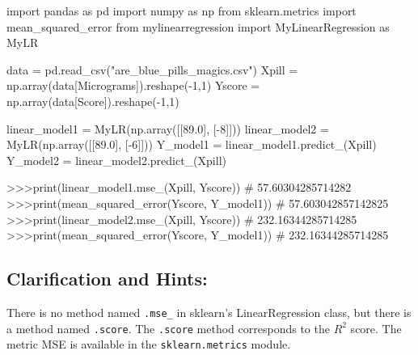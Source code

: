 \documentclass[]{article}
\newenvironment{Shaded}{\begin{snugshade}}{\end{snugshade}}
\newcommand{\BuiltInTok}[1]{\textcolor[rgb]{0.50,0.55,0.55}{#1}}
\newcommand{\CommentTok}[1]{\textcolor[rgb]{0.48,0.49,0.49}{#1}}
\newcommand{\DecValTok}[1]{\textcolor[rgb]{0.96,0.45,0.00}{#1}}
\newcommand{\FloatTok}[1]{\textcolor[rgb]{0.96,0.45,0.00}{#1}}
\newcommand{\ImportTok}[1]{\textcolor[rgb]{0.15,0.68,0.38}{#1}}
\newcommand{\NormalTok}[1]{\textcolor[rgb]{0.81,0.81,0.76}{#1}}
\newcommand{\OperatorTok}[1]{\textcolor[rgb]{0.81,0.81,0.76}{#1}}
\newcommand{\StringTok}[1]{\textcolor[rgb]{0.96,0.31,0.31}{#1}}
\begin{document}
\begin{Shaded}
\begin{Highlighting}[]
\ImportTok{import}\NormalTok{ pandas }\ImportTok{as}\NormalTok{ pd}
\ImportTok{import}\NormalTok{ numpy }\ImportTok{as}\NormalTok{ np}
\ImportTok{from}\NormalTok{ sklearn.metrics }\ImportTok{import}\NormalTok{ mean_squared_error}
\ImportTok{from}\NormalTok{ mylinearregression }\ImportTok{import}\NormalTok{ MyLinearRegression }\ImportTok{as}\NormalTok{ MyLR}

\NormalTok{data }\OperatorTok{=}\NormalTok{ pd.read_csv(}\StringTok{"are_blue_pills_magics.csv"}\NormalTok{)}
\NormalTok{Xpill }\OperatorTok{=}\NormalTok{ np.array(data[Micrograms]).reshape(}\OperatorTok{-}\DecValTok{1}\NormalTok{,}\DecValTok{1}\NormalTok{)}
\NormalTok{Yscore }\OperatorTok{=}\NormalTok{ np.array(data[Score]).reshape(}\OperatorTok{-}\DecValTok{1}\NormalTok{,}\DecValTok{1}\NormalTok{)}

\NormalTok{linear_model1 }\OperatorTok{=}\NormalTok{ MyLR(np.array([[}\FloatTok{89.0}\NormalTok{], [}\OperatorTok{-}\DecValTok{8}\NormalTok{]]))}
\NormalTok{linear_model2 }\OperatorTok{=}\NormalTok{ MyLR(np.array([[}\FloatTok{89.0}\NormalTok{], [}\OperatorTok{-}\DecValTok{6}\NormalTok{]]))}
\NormalTok{Y_model1 }\OperatorTok{=}\NormalTok{ linear_model1.predict_(Xpill)}
\NormalTok{Y_model2 }\OperatorTok{=}\NormalTok{ linear_model2.predict_(Xpill)}

\OperatorTok{>>>}\BuiltInTok{print}\NormalTok{(linear_model1.mse_(Xpill, Yscore))}
\CommentTok{# 57.60304285714282}
\OperatorTok{>>>}\BuiltInTok{print}\NormalTok{(mean_squared_error(Yscore, Y_model1))}
\CommentTok{# 57.603042857142825}
\OperatorTok{>>>}\BuiltInTok{print}\NormalTok{(linear_model2.mse_(Xpill, Yscore))}
\CommentTok{# 232.16344285714285}
\OperatorTok{>>>}\BuiltInTok{print}\NormalTok{(mean_squared_error(Yscore, Y_model1))}
\CommentTok{# 232.16344285714285}
\end{Highlighting}
\end{Shaded}

\hypertarget{clarification-and-hints}{%
\subsection{Clarification and Hints:}\label{clarification-and-hints}}

There is no method named \texttt{.mse\_} in sklearn's LinearRegression
class, but there is a method named \texttt{.score}. The \texttt{.score}
method corresponds to the \(R^2\) score. The metric MSE is available in
the \texttt{sklearn.metrics} module.
\end{document}
